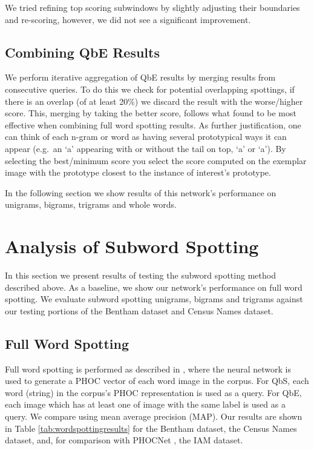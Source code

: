 \documentclass[ms,electronic,twosidetoc,letterpaper,chaptercenter,parttop,lol,lof,lot]{byumsphd}
\begin{document}
We tried refining top scoring subwindows by slightly adjusting their boundaries and re-scoring, however, we did not see a significant improvement. %

\subsection{Combining QbE Results}\label{combine}

We perform iterative aggregation of QbE results by merging results from consecutive queries. To do this we check for potential overlapping spottings, if there is an overlap (of at least 20\%) we discard the result with the worse/higher score. This, merging by taking the better score, follows what \cite{Zagoris2015} found to be most effective when combining full word spotting results. As further justification, one can think of each n-gram or word as having several prototypical ways it can appear (e.g.~an `a' appearing with or without the tail on top, `\textsf{a}' or `{\selectfont\footnotesize a}'). By selecting the best/minimum score you select the score computed on the exemplar image with the prototype closest to the instance of interest's prototype.

In the following section we show results of this network's performance on unigrams, bigrams, trigrams and whole words.


\section{Analysis of Subword Spotting}

In this section we present results of testing the subword spotting method described above.
As a baseline, we show our network's performance on full word spotting. We evaluate subword spotting unigrams, bigrams and trigrams against our testing portions of the Bentham dataset and Census Names dataset. 

\subsection{Full Word Spotting}

Full word spotting is performed as described in \cite{sudholt2016}, where the neural network is used to generate a PHOC vector of each word image in the corpus. For QbS, each word (string) in the corpus's PHOC representation is used as a query. For QbE, each image which has at least one of image with the same label is used as a query. We compare using mean average precision (MAP). Our results are shown in Table \ref{tab:wordspottingresults} for the Bentham dataset, the Census Names dataset, and, for comparison with PHOCNet \cite{sudholt2016,sudholt2017}, the IAM dataset.
\end{document}
